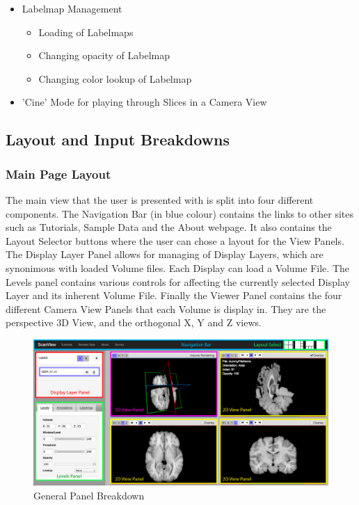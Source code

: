 \documentclass[a4paper,11pt,twoside]{article}
\begin{document}
\begin{itemize}
\item Labelmap Management

  \begin{itemize}
  \item Loading of Labelmaps
  \item Changing opacity of Labelmap
  \item Changing color lookup of Labelmap
  \end{itemize}

\item 'Cine' Mode for playing through Slices in a Camera View

\end{itemize}


\subsection{Layout and Input Breakdowns}

\subsubsection{Main Page Layout}

The main view that the user is presented with is split into four different components. The Navigation Bar (in blue colour) contains the links to other sites such as Tutorials, Sample Data and the About webpage. It also contains the Layout Selector buttons where the user can chose a layout for the View Panels. The Display Layer Panel allows for managing of Display Layers, which are synonimous with loaded Volume files. Each Display can load a Volume File. The Levels panel contains various controls for affecting the currently selected Display Layer and its inherent Volume File. Finally the Viewer Panel contains the four different Camera View Panels that each Volume is display in. They are the perspective 3D View, and the orthogonal X, Y and Z views.

\begin{figure}[ht!]
\centering
\includegraphics[width=165mm]{graphics/features_01.png}
\caption{General Panel Breakdown}
\label{fig:UIdesign1}
\end{figure}
\end{document}
